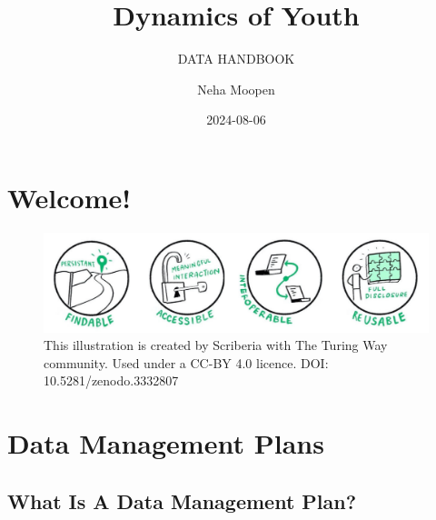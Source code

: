 \documentclass[
  letterpaper,
  DIV=11,
  numbers=noendperiod]{scrreprt}
\title{Dynamics of Youth}
\subtitle{DATA HANDBOOK}
\author{Neha Moopen}
\date{2024-08-06}
\renewcommand*\contentsname{Table of contents}
\newcommand\contentsname{Table of contents}
\begin{document}
\maketitle
\ifdefined\Shaded\renewenvironment{Shaded}{\begin{tcolorbox}[sharp corners, frame hidden, interior hidden, breakable, enhanced, borderline west={3pt}{0pt}{shadecolor}, boxrule=0pt]}{\end{tcolorbox}}\fi

\renewcommand*\contentsname{Table of contents}
{
\hypersetup{linkcolor=}
\setcounter{tocdepth}{2}
\tableofcontents
}

\hypertarget{welcome}{%
\chapter*{Welcome!}\label{welcome}}


\begin{figure}

{\centering \includegraphics{images/fair-1x4.png}

}

\caption{This illustration is created by Scriberia with The Turing Way
community. Used under a CC-BY 4.0 licence. DOI: 10.5281/zenodo.3332807}

\end{figure}


\hypertarget{data-management-plans}{%
\chapter*{Data Management Plans}\label{data-management-plans}}


\hypertarget{what-is-a-data-management-plan}{%
\section*{What Is A Data Management
Plan?}\label{what-is-a-data-management-plan}}
\end{document}
